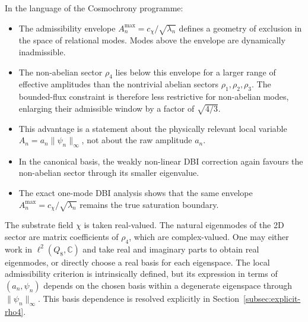   In the language of the Cosmochrony programme:
  \begin{itemize}
    \item The admissibility envelope $A_n^{\max} = c_\chi / \sqrt{\lambda_n}$ defines a
    geometry of exclusion in the space of relational modes.
    Modes above the envelope are dynamically inadmissible.
    \item The non-abelian sector $\rho_4$ lies below this envelope for a larger
    range of effective amplitudes than the nontrivial abelian sectors
    $\rho_1, \rho_2, \rho_3$.
    The bounded-flux constraint is therefore less restrictive for non-abelian modes,
    enlarging their admissible window by a factor of $\sqrt{4/3}$.
    \item This advantage is a statement about the physically relevant local variable
    $A_n = a_n \|\psi_n\|_\infty$, not about the raw amplitude $a_n$.
    \item In the canonical basis, the weakly non-linear DBI correction again favours
    the non-abelian sector through its smaller eigenvalue.
    \item The exact one-mode DBI analysis shows that the same envelope
    $A_n^{\max} = c_\chi/\sqrt{\lambda_n}$ remains the true saturation boundary.
  \end{itemize}

  \begin{remark}
      The substrate field $\chi$ is taken real-valued.
      The natural eigenmodes of the 2D sector are matrix coefficients of $\rho_4$,
      which are complex-valued.
      One may either work in $\ell^2(Q_8,\mathbb{C})$ and take real and imaginary parts to
      obtain real eigenmodes, or directly choose a real basis for each eigenspace.
      The local admissibility criterion is intrinsically defined, but its expression in
      terms of $(a_n,\psi_n)$ depends on the chosen basis within a degenerate eigenspace
      through $\|\psi_n\|_\infty$.
      This basis dependence is resolved explicitly in
      Section~\ref{subsec:explicit-rho4}.
  \end{remark}
